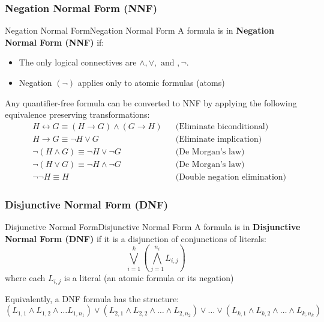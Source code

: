 \documentclass[a4paper]{article}
\theoremstyle{definition}
\begin{document}
\subsubsection{Negation Normal Form (NNF)}
\begin{definition}{Negation Normal Form}{Negation Normal Form}
A formula is in \textbf{Negation Normal Form (NNF)} if:
\begin{itemize}
	\item The only logical connectives are \( \wedge, \vee, \text{ and }, \lnot \).
	\item Negation \( (\lnot) \) applies only to atomic formulas (atoms)
\end{itemize}  
\end{definition}
Any quantifier-free formula can be converted to NNF by applying the following equivalence preserving transformations:
\begin{align*}
	& H \leftrightarrow G \equiv (H \rightarrow G) \wedge (G \rightarrow H) && \text{(Eliminate biconditional)} \\
	& H \rightarrow G \equiv \lnot H \vee G && \text{(Eliminate implication)} \\
	& \lnot(H \wedge G) \equiv \lnot H \vee \lnot G && \text{(De Morgan's law)} \\
	& \lnot(H \vee G) \equiv \lnot H \wedge \lnot G && \text{(De Morgan's law)} \\
	& \lnot \lnot H \equiv H && \text{(Double negation elimination)}
\end{align*}
\subsubsection{Disjunctive Normal Form (DNF)}
\begin{definition}{Disjunctive Normal Form}{Disjunctive Normal Form}
A formula is in \textbf{Disjunctive Normal Form (DNF)} if it is a disjunction of conjunctions of literals:
\[
  \bigvee_{i = 1}^{k} (\bigwedge_{j = 1}^{n_i} L_{i,j})
\]
where each \( L_{i,j} \) is a literal (an atomic formula or its negation)
\end{definition}
Equivalently, a DNF formula has the structure:
\[
  (L_{1,1} \wedge L_{1,2} \wedge \ldots L_{1,n_1}) \vee (L_{2,1} \wedge L_{2,2} \wedge \ldots \wedge L_{2,n_2}) \vee \ldots \vee (L_{k,1} \wedge L_{k,2} \wedge \ldots \wedge L_{k,n_k})
\]
\end{document}
